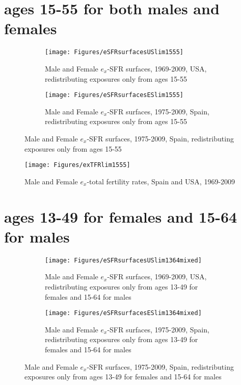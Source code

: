 \section{ages 15-55 for both males and females}
\label{sec:1555}
\begin{figure}[ht!]
        \centering
        \begin{subfigure}
                \centering
                \caption{Male and Female $e_x$-SFR surfaces, 1969-2009, USA,
                redistributing exposures only from ages 15-55}
                \texttt{[image: Figures/eSFRsurfacesUSlim1555]}
                \label{fig:exSFRsurfUSlim15_55}
        \end{subfigure}
        \begin{subfigure}
                \centering
                \caption{Male and Female $e_x$-SFR surfaces, 1975-2009, Spain,
                redistributing exposures only from ages 15-55}
                \texttt{[image: Figures/eSFRsurfacesESlim1555]} 
                \label{fig:exSFRsurfESlim15_55}
        \end{subfigure}
\end{figure}

\begin{figure}[ht!]
        \centering  
          \caption{Male and Female $e_x$-total fertility rates, Spain
          and USA, 1969-2009}
           \texttt{[image: Figures/exTFRlim1555]}
          \label{fig:exTFRlim15_55}
\end{figure}
\pagebreak

\section{ages 13-49 for females and 15-64 for males}
\label{sec:1364}
\begin{figure}[ht!]
        \centering
        \begin{subfigure}
                \centering
                \caption{Male and Female $e_x$-SFR surfaces, 1969-2009, USA,
                redistributing exposures only from ages 13-49 for females and 15-64 for males}
                \texttt{[image: Figures/eSFRsurfacesUSlim1364mixed]}
                \label{fig:exSFRsurfUSlim1364}
        \end{subfigure}
        \begin{subfigure}
                \centering
                \caption{Male and Female $e_x$-SFR surfaces, 1975-2009, Spain,
                redistributing exposures only from ages 13-49 for females and 15-64 for males}
                \texttt{[image: Figures/eSFRsurfacesESlim1364mixed]} 
                \label{fig:exSFRsurfESlim1364}
        \end{subfigure}
\end{figure}

